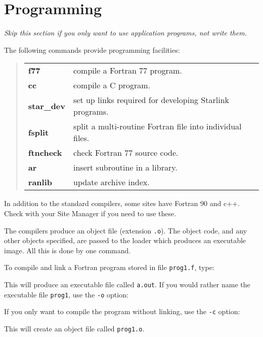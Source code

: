 \documentclass[twoside,11pt,nolof]{starlink}
\begin{document}
\newpage

\section{Programming}

\emph{Skip this section if you only want to use application programs, not write
them.}

The following commands provide programming facilities:
\begin{quote}
\begin{tabular}{lp{67mm}}

\textbf{f77}       & compile a Fortran 77 program.\\
\textbf{cc}        & compile a C program.\\
\textbf{star\_dev} & set up links required for developing Starlink programs.\\
\textbf{fsplit}    & split a multi-routine Fortran file into individual files.\\
\textbf{ftncheck}  & check Fortran 77 source code.\\
\textbf{ar}        & insert subroutine in a library.\\
\textbf{ranlib}    & update archive index.

\end{tabular}
\end{quote}
In addition to the standard compilers, some sites have Fortran 90 and c++.
Check with your Site Manager if you need to use these.

The compilers produce an object file (extension \texttt{.o}).
The object code, and any other objects specified, are passed to the loader
which produces an executable image.
All this is done by one command.

To compile and link a Fortran program stored in file \texttt{prog1.f}, type:
\begin{terminalv}
\end{terminalv}
This will produce an executable file called \texttt{a.out}.
If you would rather name the executable file \texttt{prog1}, use the \texttt{-o}
option:
\begin{terminalv}
\end{terminalv}
If you only want to compile the program without linking, use the \texttt{-c}
option:
\begin{terminalv}
\end{terminalv}
This will create an object file called \texttt{prog1.o}.
\end{document}
